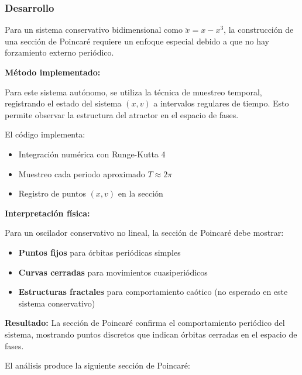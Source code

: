 \documentclass[a4paper,12pt]{article}
\theoremstyle{mytheor}
\begin{document}
\subsubsection{Desarrollo}

Para un sistema conservativo bidimensional como $\ddot{x} = x - x^3$, la construcción de una sección de Poincaré requiere un enfoque especial debido a que no hay forzamiento externo periódico.

\textbf{Método implementado:}

Para este sistema autónomo, se utiliza la técnica de muestreo temporal, registrando el estado del sistema $(x, v)$ a intervalos regulares de tiempo. Esto permite observar la estructura del atractor en el espacio de fases.

El código implementa:
\begin{itemize}
    \item Integración numérica con Runge-Kutta 4
    \item Muestreo cada periodo aproximado $T \approx 2\pi$
    \item Registro de puntos $(x, v)$ en la sección
\end{itemize}

\textbf{Interpretación física:}

Para un oscilador conservativo no lineal, la sección de Poincaré debe mostrar:
\begin{itemize}
    \item \textbf{Puntos fijos} para órbitas periódicas simples
    \item \textbf{Curvas cerradas} para movimientos cuasiperiódicos
    \item \textbf{Estructuras fractales} para comportamiento caótico (no esperado en este sistema conservativo)
\end{itemize}

\textbf{Resultado:} La sección de Poincaré confirma el comportamiento periódico del sistema, mostrando puntos discretos que indican órbitas cerradas en el espacio de fases.

El análisis produce la siguiente sección de Poincaré:
\end{document}
